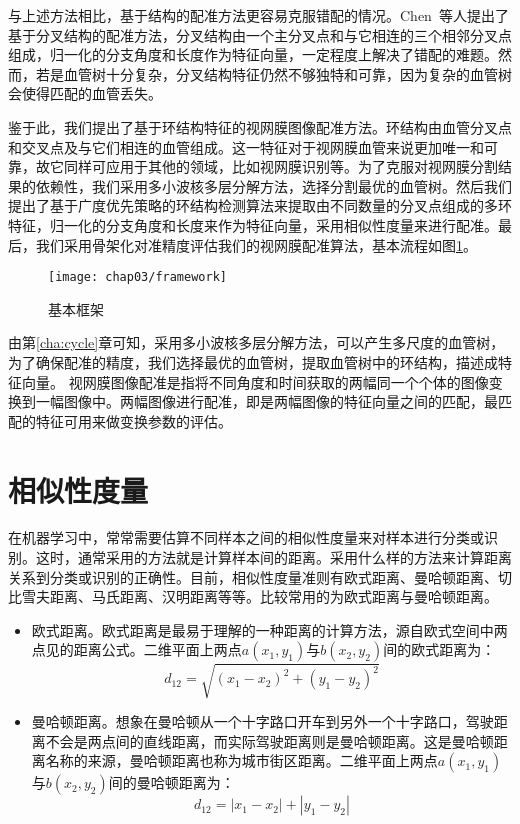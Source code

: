 与上述方法相比，基于结构的配准方法更容易克服错配的情况。Chen~\cite{chen2011retinal,chen2015retinal}等人提出了基于分叉结构的配准方法，分叉结构由一个主分叉点和与它相连的三个相邻分叉点组成，归一化的分支角度和长度作为特征向量，一定程度上解决了错配的难题。然而，若是血管树十分复杂，分叉结构特征仍然不够独特和可靠，因为复杂的血管树会使得匹配的血管丢失。

鉴于此，我们提出了基于环结构特征的视网膜图像配准方法。环结构由血管分叉点和交叉点及与它们相连的血管组成。这一特征对于视网膜血管来说更加唯一和可靠，故它同样可应用于其他的领域，比如视网膜识别等。为了克服对视网膜分割结果的依赖性，我们采用多小波核多层分解方法，选择分割最优的血管树。然后我们提出了基于广度优先策略的环结构检测算法来提取由不同数量的分叉点组成的多环特征，归一化的分支角度和长度来作为特征向量，采用相似性度量来进行配准。最后，我们采用骨架化对准精度评估我们的视网膜配准算法，基本流程如图\ref{fig:framework}。
\begin{figure}
  \centering
  \texttt{[image: chap03/framework]}
  \caption{基本框架}
  \label{fig:framework}
\end{figure}


由第\ref{cha:cycle}章可知，采用多小波核多层分解方法，可以产生多尺度的血管树，为了确保配准的精度，我们选择最优的血管树，提取血管树中的环结构，描述成特征向量。
视网膜图像配准是指将不同角度和时间获取的两幅同一个个体的图像变换到一幅图像中。两幅图像进行配准，即是两幅图像的特征向量之间的匹配，最匹配的特征可用来做变换参数的评估。


\section{相似性度量}
\label{cha:similarity}

在机器学习中，常常需要估算不同样本之间的相似性度量来对样本进行分类或识别。这时，通常采用的方法就是计算样本间的距离。采用什么样的方法来计算距离关系到分类或识别的正确性。目前，相似性度量准则有欧式距离、曼哈顿距离、切比雪夫距离、马氏距离、汉明距离等等。比较常用的为欧式距离与曼哈顿距离。

\begin{itemize}
\item 欧式距离。欧式距离是最易于理解的一种距离的计算方法，源自欧式空间中两点见的距离公式。二维平面上两点$a(x_1,y_1)$与$b(x_2,y_2)$间的欧式距离为：
\begin{equation}
d_{12}=\sqrt{(x_1-x_2)^2+(y_1-y_2)^2}
\end{equation}
\item 曼哈顿距离。想象在曼哈顿从一个十字路口开车到另外一个十字路口，驾驶距离不会是两点间的直线距离，而实际驾驶距离则是曼哈顿距离。这是曼哈顿距离名称的来源，曼哈顿距离也称为城市街区距离。二维平面上两点$a(x_1,y_1)$与$b(x_2,y_2)$间的曼哈顿距离为：
\begin{equation}
d_{12}=|x_1-x_2|+|y_1-y_2|
\end{equation}
\end{itemize}

